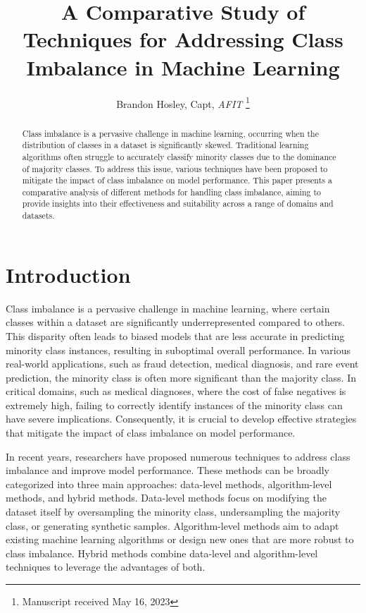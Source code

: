 \documentclass[journal]{IEEEtran}
\title{A Comparative Study of Techniques for Addressing Class Imbalance in Machine Learning}
\author{Brandon Hosley, Capt, \textit{AFIT}%
	\thanks{Manuscript received May 16, 2023%
}}
\begin{document}
	
	\maketitle
	
	
	\begin{abstract}
		Class imbalance is a pervasive challenge in machine learning, occurring when the distribution of classes in a dataset is significantly skewed. Traditional learning algorithms often struggle to accurately classify minority classes due to the dominance of majority classes. To address this issue, various techniques have been proposed to mitigate the impact of class imbalance on model performance. This paper presents a comparative analysis of different methods for handling class imbalance, aiming to provide insights into their effectiveness and suitability across a range of domains and datasets.
	\end{abstract}
	
	\section{Introduction}
	\label{sec:introduction}
	Class imbalance is a pervasive challenge in machine learning, where certain classes within a dataset are significantly underrepresented compared to others. This disparity often leads to biased models that are less accurate in predicting minority class instances, resulting in suboptimal overall performance. In various real-world applications, such as fraud detection, medical diagnosis, and rare event prediction, the minority class is often more significant than the majority class. In critical domains, such as medical diagnoses, where the cost of false negatives is extremely high, failing to correctly identify instances of the minority class can have severe implications. Consequently, it is crucial to develop effective strategies that mitigate the impact of class imbalance on model performance.
	
	In recent years, researchers have proposed numerous techniques to address class imbalance and improve model performance. These methods can be broadly categorized into three main approaches: data-level methods, algorithm-level methods, and hybrid methods. Data-level methods focus on modifying the dataset itself by oversampling the minority class, undersampling the majority class, or generating synthetic samples. Algorithm-level methods aim to adapt existing machine learning algorithms or design new ones that are more robust to class imbalance. Hybrid methods combine data-level and algorithm-level techniques to leverage the advantages of both.
	
\end{document}
